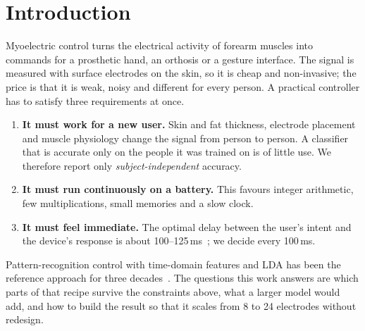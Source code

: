 \documentclass[11pt,a4paper]{article}
\begin{document}
\section{Introduction}
Myoelectric control turns the electrical activity of forearm muscles into commands for a prosthetic hand, an
orthosis or a gesture interface. The signal is measured with surface electrodes on the skin, so it is cheap and
non-invasive; the price is that it is weak, noisy and different for every person. A practical controller has
to satisfy three requirements at once.
\begin{enumerate}
\item \textbf{It must work for a new user.} Skin and fat thickness, electrode placement and muscle physiology
change the signal from person to person. A classifier that is accurate only on the people it was trained on is
of little use. We therefore report only \emph{subject-independent} accuracy.
\item \textbf{It must run continuously on a battery.} This favours integer arithmetic, few multiplications,
small memories and a slow clock.
\item \textbf{It must feel immediate.} The optimal delay between the user's intent and the device's response
is about 100--125\,ms~\cite{farrell2007}; we decide every 100\,ms.
\end{enumerate}
Pattern-recognition control with time-domain features and LDA has been the reference approach for three
decades~\cite{hudgins1993,englehart2003,scheme2011}. The questions this work answers are which parts of that
recipe survive the constraints above, what a larger model would add, and how to build the result so that it
scales from 8 to 24 electrodes without redesign.
\end{document}
